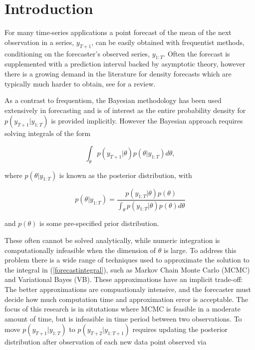 \documentclass{article}\usepackage[]{graphicx}\usepackage[]{color}
\numberwithin{equation}{section}
\begin{document}
\tableofcontents
\section{Introduction} 

For many time-series applications a point forecast of the mean of the next observation in a series, $y_{T+1}$, can be easily obtained with frequentist methods, conditioning on the forecaster's observed series, $y_{1:T}$. Often the forecast is supplemented with a prediction interval backed by asymptotic theory, however there is a growing demand in the literature for density forecasts which are typically much harder to obtain, see \citet{Gneiting2014} for a review.

As a contrast to frequentism, the Bayesian methodology has been used extensively in forecasting \citep{Geweke2006} and is of interest as the entire probability density for $p(y_{T+1} | y_{1:T})$ is provided implicitly. However the Bayesian approach requires solving integrals of the form 

\begin{equation}
\label{forecastintegral}
\int_\theta p(y_{T+1} | \theta) p(\theta | y_{1:T}) d \theta,
\end{equation}

where $p(\theta | y_{1:T})$ is known as the posterior distribution, with

\begin{equation}
\label{posterior}
 p(\theta | y_{1:T}) = \frac{p(y_{1:T}|\theta)p(\theta)}{\int_\theta p(y_{1:T}|\theta)p(\theta) d\theta}
\end{equation}

and $p(\theta)$ is some pre-specified prior distribution.

These often cannot be solved analytically, while numeric integration is computationally infeasible when the dimension of $\theta$ is large. To address this problem there is a wide range of techniques used to approximate the solution to the integral in (\ref{forecastintegral}), such as Markov Chain Monte Carlo (MCMC) and Variational Bayes (VB). These approximations have an implicit trade-off: The better approximations are compuationaly intensive, and the forecaster must decide how much computation time and approximation error is acceptable. The focus of this research is in situtations where MCMC is feasible in a moderate amount of time, but is infeasible in time period between two observations. To move $p(y_{T+1} | y_{1:T})$ to $p(y_{T+2} | y_{1:T+1})$ requires updating the posterior distribution after observation of each new data point observed via
\end{document}
